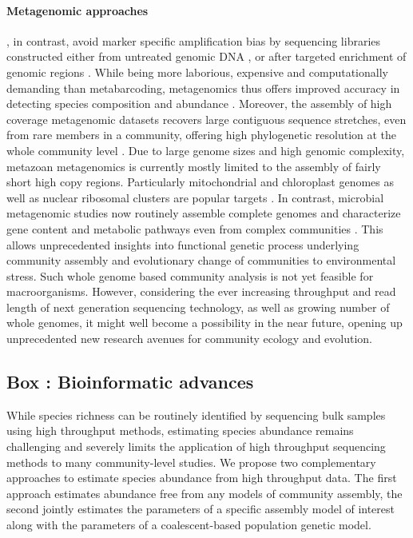 \documentclass[12pt]{article}
\newcounter{Box}
\begin{document}
\paragraph{Metagenomic approaches}, in contrast, avoid marker specific
amplification bias by sequencing libraries constructed either from
untreated genomic DNA \citep{dodsworth2015, linard2015, tang2014}, or
after targeted enrichment of genomic regions \citep{liu2016}. While
being more laborious, expensive and computationally demanding than
metabarcoding, metagenomics thus offers improved accuracy in detecting
species composition and abundance \citep{zhou2013}. Moreover, the
assembly of high coverage metagenomic datasets recovers large
contiguous sequence stretches, even from rare members in a community,
offering high phylogenetic resolution at the whole community level
\citep{coissac2016}. Due to large genome sizes and high genomic
complexity, metazoan metagenomics is currently mostly limited to the
assembly of fairly short high copy regions. Particularly mitochondrial
and chloroplast genomes as well as nuclear ribosomal clusters are
popular targets \citep{dodsworth2015, coissac2016}. In contrast,
microbial metagenomic studies now routinely assemble complete genomes
and characterize gene content and metabolic pathways even from complex
communities \citep{nielsen2014}. This allows unprecedented insights
into functional genetic process underlying community assembly and
evolutionary change of communities to environmental stress.  Such
whole genome based community analysis is not yet feasible for
macroorganisms. However, considering the ever increasing throughput
and read length of next generation sequencing technology, as well as
growing number of whole genomes, it might well become a possibility in
the near future, opening up unprecedented new research avenues for
community ecology and evolution.


\label{box:dry}
\subsection*{Box \theBox: Bioinformatic advances}

While species richness can be routinely identified by sequencing bulk
samples using high throughput methods, estimating species abundance
remains challenging \citep{elbrecht2015} and severely limits the
application of high throughput sequencing methods to many
community-level studies. We propose two complementary approaches to
estimate species abundance from high throughput data.  The first
approach estimates abundance free from any models of community
assembly, the second jointly estimates the parameters of a specific
assembly model of interest along with the parameters of a
coalescent-based population genetic model.
\end{document}
